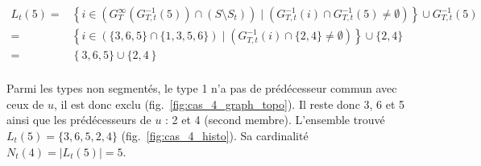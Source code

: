 
	\begin{equation}
	\begin{split}
	 L_t(5) = & \left\{ i \in \left( G_T^{\infty}(G_{T,t}^{-1}(5)) \cap ( S \setminus S_t ) \right)\;|\; \left( G_{T,t}^{-1} (i) \cap G_{T,t}^{-1} (5) \neq \emptyset \right) \right\} \cup  G_{T,t}^{-1}(5)\\
		= & \left\{ i \in \left( \{3,6,5\} \cap \{1,3,5,6\} \right)\;|\; \left( G_{T,t}^{-1} (i) \cap \{2,4\} \neq \emptyset \right) \right\} \cup  \{2,4\} \\
		= & \left\{3,6,5\} \cup \{ 2,4 \right\} \\
	\end{split}
	\end{equation}

	Parmi les types non segmentés, le type 1 n'a pas de prédécesseur commun avec ceux de $u$, il est donc exclu (fig.~\ref{fig:cas_4_graph_topo}). Il reste donc 3, 6 et 5 ainsi que les prédécesseurs de $u$ : 2 et 4 (second membre). L'ensemble trouvé $L_t(5) = \{3,6,5,2,4\}$ (fig.~\ref{fig:cas_4_histo}). Sa cardinalité $N_t(4) = \left|{L_t(5)}\right| = 5$.\vspace{1em}

